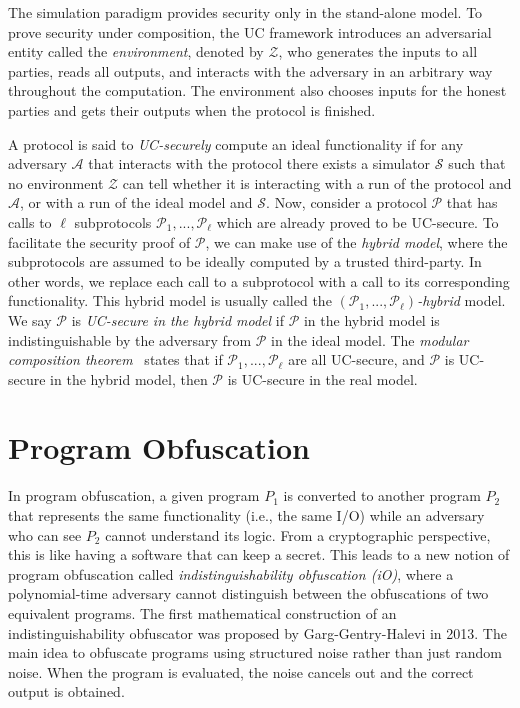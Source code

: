 \documentclass[10pt]{article}
\theoremstyle{plain}
\begin{document}
The simulation paradigm provides security only in the stand-alone
model. To prove security under composition, the UC framework introduces
an adversarial entity called the \emph{environment}, denoted by $\mathcal{Z}$,
who generates the inputs to all parties, reads all outputs, and interacts
with the adversary in an arbitrary way throughout the computation.
The environment also chooses inputs for the honest parties and gets
their outputs when the protocol is finished.

A protocol is said to \emph{UC-securely} compute an ideal functionality
if for any adversary $\mathcal{A}$ that interacts with the protocol
there exists a simulator $\mathcal{S}$ such that no environment $\mathcal{Z}$
can tell whether it is interacting with a run of the protocol and
$\mathcal{A}$, or with a run of the ideal model and $\mathcal{S}$.
Now, consider a protocol $\mathcal{P}$ that has calls to $\ell$
subprotocols $\mathcal{P}_{1},...,\mathcal{P}_{\ell}$ which are already
proved to be UC-secure. To facilitate the security proof of $\mathcal{P}$,
we can make use of the \emph{hybrid model}, where the subprotocols
are assumed to be ideally computed by a trusted third-party. In other
words, we replace each call to a subprotocol with a call to its corresponding
functionality. This hybrid model is usually called the \emph{$(\mathcal{P}_{1},...,\mathcal{P}_{\ell})$-hybrid}
model. We say $\mathcal{P}$ is \emph{UC-secure in the hybrid model}
if $\mathcal{P}$ in the hybrid model is indistinguishable by the
adversary from $\mathcal{P}$ in the ideal model. The \emph{modular
	composition theorem}~\cite{Canetti:2000:JC:0933-2790} states that
if $\mathcal{P}_{1},...,\mathcal{P}_{\ell}$ are all UC-secure, and
$\mathcal{P}$ is UC-secure in the hybrid model, then $\mathcal{P}$
is UC-secure in the real model.

\section{Program Obfuscation}

In program obfuscation, a given program $P_{1}$ is converted to another
program $P_{2}$ that represents the same functionality (i.e., the
same I/O) while an adversary who can see $P_{2}$ cannot understand
its logic. From a cryptographic perspective, this is like having a
software that can keep a secret. This leads to a new notion of program
obfuscation called \emph{indistinguishability obfuscation (iO)}, where
a polynomial-time adversary cannot distinguish between the obfuscations
of two equivalent programs. The first mathematical construction of
an indistinguishability obfuscator was proposed by Garg-Gentry-Halevi
in 2013. The main idea to obfuscate programs using structured noise
rather than just random noise. When the program is evaluated, the
noise cancels out and the correct output is obtained. 
\end{document}
